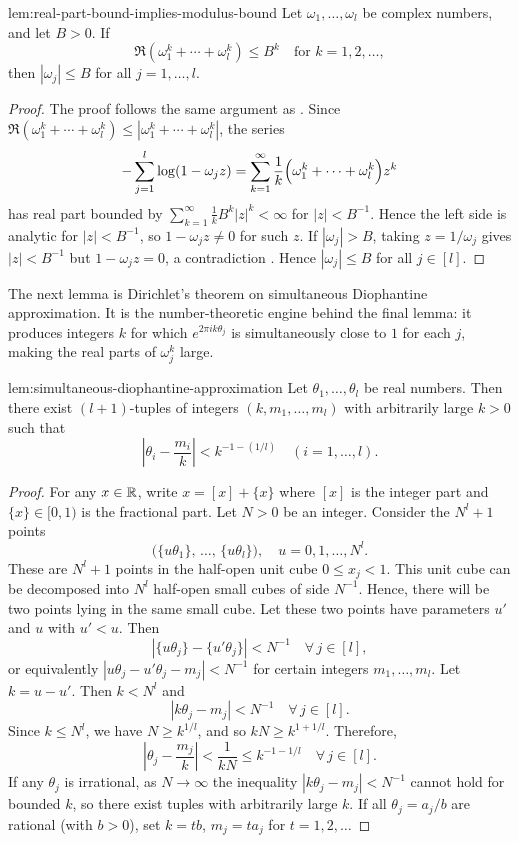 \begin{Lemma}{}{lem:real-part-bound-implies-modulus-bound}
  Let $\omega_1,\dots,\omega_l$ be complex numbers, and let $B > 0$. If
  \[
    \Re(\omega_1^k + \cdots + \omega_l^k) \le B^k
    \quad \text{for } k = 1,2,\dots,
  \]
  then $|\omega_j| \le B $ for all $j = 1,\dots,l$.
\end{Lemma}
\begin{proof}
  The proof follows the same argument as . Since $\Re(\omega_1^k+\cdots+\omega_l^k) \leq |\omega_1^k+\cdots+\omega_l^k|$, the series
  \[
    -\sum_{j=1}^{l}\log(1-\omega_j z) = \sum_{k=1}^{\infty}\frac{1}{k}\Bigl(\omega_1^k+\cdots+\omega_l^k\Bigr)z^k
  \]
  has real part bounded by $\sum_{k=1}^\infty \frac{1}{k} B^k |z|^k < \infty$ for $|z| < B^{-1}$. Hence the left side is analytic for $|z| < B^{-1}$, so $1-\omega_j z \neq 0$ for such $z$. If $|\omega_j| > B$, taking $z = 1/\omega_j$ gives $|z| < B^{-1}$ but $1-\omega_j z = 0$, a contradiction \ctr. Hence $|\omega_j| \leq B$ for all $j \in [l]$.
\end{proof}

The next lemma is Dirichlet's theorem on simultaneous Diophantine approximation. It is the number-theoretic engine behind the final lemma: it produces integers $k$ for which $e^{2\pi i k\theta_j}$ is simultaneously close to $1$ for each $j$, making the real parts of $\omega_j^k$ large.

\begin{Lemma}{}{lem:simultaneous-diophantine-approximation}
  Let $\theta_1,\dots,\theta_l$ be real numbers. Then there exist $(l+1)$-tuples of integers $(k, m_1,\dots,m_l)$ with arbitrarily large $k > 0$ such that
  \[
    \left|\theta_i - \frac{m_i}{k}\right| < k^{-1 - (1/l)} \quad (i = 1,\dots,l).
  \]
\end{Lemma}
\begin{proof}
  For any $x\in\mathbb{R}$, write $x = [x] + \{x\}$ where $[x]$ is the integer part and $\{x\}\in[0,1)$ is the fractional part. Let $N > 0$ be an integer. Consider the $N^l + 1$ points
  \[
    \bigl(\{u\theta_1\},\,\dots,\,\{u\theta_l\}\bigr), \quad u = 0,1,\dots,N^l.
  \]
  These are $N^l+1$ points in the half-open unit cube $0\leq x_j < 1$. This unit cube can be decomposed into $N^l$ half-open small cubes of side $N^{-1}$. Hence, there will be two points lying in the same small cube. Let these two points have parameters $u'$ and $u$ with $u'<u$. Then
  \[
    |\{u\theta_j\} - \{u'\theta_j\}| < N^{-1} \quad \forall\, j\in[l],
  \]
  or equivalently $|u\theta_j - u'\theta_j - m_j| < N^{-1}$ for certain integers $m_1,\dots,m_l$. Let $k = u - u'$. Then $k < N^l$ and
  \[
    |k\theta_j - m_j| < N^{-1} \quad \forall\, j\in[l].
  \]
  Since $k\leq N^l$, we have $N \geq k^{1/l}$, and so $kN\geq k^{1+1/l}$. Therefore,
  \[
    \left|\theta_j - \frac{m_j}{k}\right| < \frac{1}{kN} \leq k^{-1-1/l} \quad \forall\, j\in[l].
  \]
  If any $\theta_j$ is irrational, as $N\to\infty$ the inequality $|k\theta_j-m_j|<N^{-1}$ cannot hold for bounded $k$, so there exist tuples with arbitrarily large $k$. If all $\theta_j = a_j/b$ are rational (with $b>0$), set $k=tb$, $m_j=ta_j$ for $t=1,2,\dots$
\end{proof}


